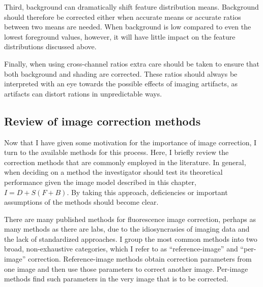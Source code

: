 Third, background can dramatically shift feature distribution
means. Background should therefore be corrected either when accurate means
or accurate ratios between two means are needed. When background
is low compared to even the lowest foreground values, however, it will have
little impact on the feature distributions discussed above.


Finally, when using cross-channel ratios extra care should be
taken to ensure that both background and shading are corrected.
These ratios should always be interpreted with an eye towards
the possible
effects of imaging artifacts, as artifacts can distort rations
in unpredictable ways.


\subsection{Review of image correction methods}
\label{imaging:correction:review}


Now that I have given some motivation for the importance of image correction, 
I turn to the available methods for this
process. Here, I briefly review the correction methods that
are commonly employed in the literature. In general, when deciding
on a method the investigator should test its theoretical performance
given the image model described in this chapter, $I=D+S(F+B)$.
By taking this approach, deficiencies or important assumptions of
the methods should become clear.


There are many published methods for fluorescence image correction,
perhaps as many methods as there are labs, due to the idiosyncrasies
of imaging data and the lack of standardized approaches.
I group the most common methods into two broad, non-exhaustive
categories, which I refer to as ``reference-image'' and ``per-image''
correction.
Reference-image methods obtain correction parameters from one image
and then use those parameters to correct another image. Per-image methods
find such parameters in the very image that is to be corrected.


